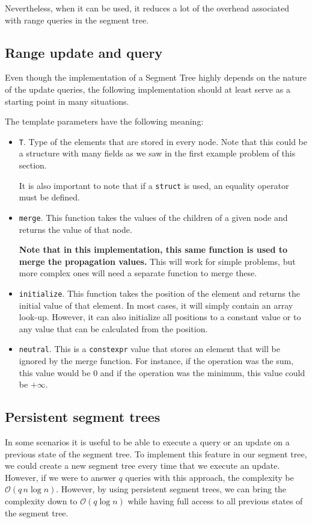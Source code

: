 Nevertheless, when it can be used, it reduces a lot of the overhead
associated with range queries in the segment tree.


\subsection{Range update and query}
Even though the implementation of a Segment Tree highly depends
on the nature of the update queries, the following implementation
should at least serve as a starting point in many situations.

The template parameters have the following meaning:
\begin{itemize}
		\item \texttt{T}. Type of the elements that are stored
				in every node. Note that this could be a structure
				with many fields as we saw in the first example
				problem of this section.

		It is also important to note that if a \texttt{struct} is
		used, an equality operator must be defined.
		\item \texttt{merge}. This function takes the values
				of the children of a given node and returns the
				value of that node.

				\textbf{Note that in this implementation, this same function
				is used to merge the propagation values.} This will work
				for simple problems, but more complex ones will need a separate
				function to merge these.
		\item \texttt{initialize}. This function takes the position of
				the element and returns the initial value of that element.
				In most cases, it will simply contain an array look-up. However,
				it can also initialize all positions to a constant value or to
				any value that can be calculated from the position.
		\item \texttt{neutral}. This is a \texttt{constexpr} value that stores
				an element that will be ignored by the merge function. For instance,
				if the operation was the sum, this value would be 0 and if the 
				operation was the minimum, this value could be $+\infty$. 
\end{itemize}
\newpage
\subsection{Persistent segment trees}
In some scenarios it is useful to be able to execute a query or an update on a
previous state of the segment tree. To implement this feature in our segment
tree, we could create a new segment tree every time that we execute an update.
However, if we were to answer $q$ queries with this approach, the complexity 
be $\mathcal{O}(q \, n\log n)$. However, by using persistent segment trees,
we can bring the complexity down to $\mathcal{O}(q\log n)$ while having full 
access to all previous states of the segment tree.

